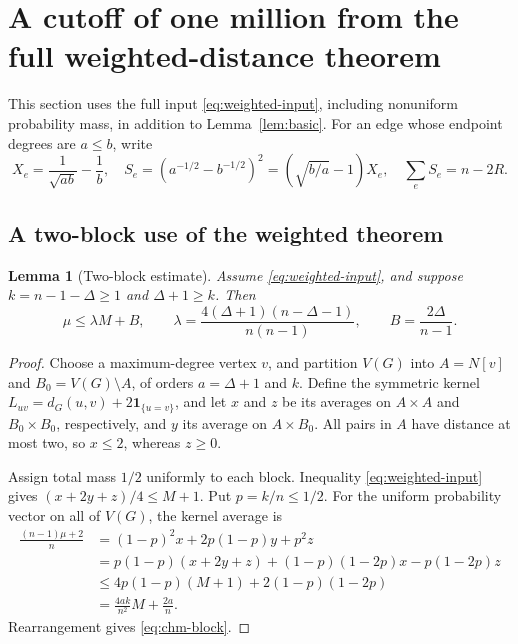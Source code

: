 \documentclass[11pt,a4paper]{article}
\newtheorem{lemma}[theorem]{Lemma}
\theoremstyle{remark}\newtheorem{remark}[theorem]{Remark}
\begin{document}
\section{A cutoff of one million from the full weighted-distance theorem}
\label{sec:ch-million}
This section uses the full input \eqref{eq:weighted-input}, including
nonuniform probability mass, in addition to Lemma~\ref{lem:basic}.
For an edge whose endpoint degrees are $a\le b$, write
\begin{equation}\label{eq:chm-edge-identity}
 X_e=\frac1{\sqrt{ab}}-\frac1b,\quad
 S_e=(a^{-1/2}-b^{-1/2})^2
     =(\sqrt{b/a}-1)X_e,\quad
 \sum_eS_e=n-2R.
\end{equation}
\subsection{A two-block use of the weighted theorem}
\begin{lemma}[Two-block estimate]\label{lem:chm-two-block}
Assume \eqref{eq:weighted-input}, and suppose $k=n-1-\Delta\ge1$ and
$\Delta+1\ge k$. Then
\begin{equation}\label{eq:chm-block}
 \mu\le\lambda M+B,\qquad
 \lambda=\frac{4(\Delta+1)(n-\Delta-1)}{n(n-1)},\qquad
 B=\frac{2\Delta}{n-1}.
\end{equation}
\end{lemma}

\begin{proof}
Choose a maximum-degree vertex $v$, and partition $V(G)$ into
$A=N[v]$ and $B_0=V(G)\setminus A$, of orders $a=\Delta+1$ and $k$.
Define the symmetric kernel
$L_{uv}=d_G(u,v)+2\boldsymbol{1}_{\{u=v\}}$, and let $x$ and $z$ be
its averages on $A\times A$ and $B_0\times B_0$, respectively, and
$y$ its average on $A\times B_0$. All pairs in $A$ have distance at
most two, so $x\le2$, whereas $z\ge0$.

Assign total mass $1/2$ uniformly to each block. Inequality
\eqref{eq:weighted-input} gives $(x+2y+z)/4\le M+1$. Put $p=k/n\le1/2$.
For the uniform probability vector on all of $V(G)$, the kernel average
is
\begin{align*}
 \frac{(n-1)\mu+2}{n}
 &=(1-p)^2x+2p(1-p)y+p^2z\\
 &=p(1-p)(x+2y+z)
      +(1-p)(1-2p)x-p(1-2p)z\\
 &\le4p(1-p)(M+1)+2(1-p)(1-2p)\\
 &=\frac{4ak}{n^2}M+\frac{2a}{n}.
\end{align*}
Rearrangement gives \eqref{eq:chm-block}.
\end{proof}
\end{document}
